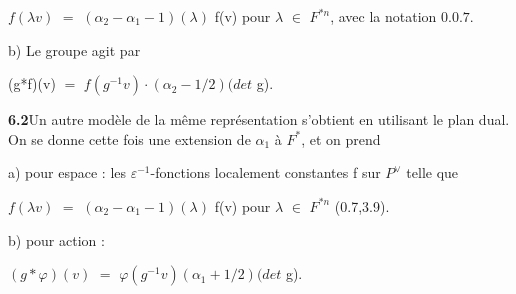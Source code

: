 \documentclass[10pt,a4paper]{article}
\begin{document}
\par\smallskip\begin{center}\begin{minipage}{0.96\textwidth}\centering
$f(\lambda{}v)$ $=$ $(\alpha{}_2-\alpha{}_1-1)(\lambda{})$ f(v) pour $\lambda{}$ $\in{}$ $F^{*n}$, avec la notation $0.0.7$.
\end{minipage}\end{center}\smallskip
\par b) Le groupe agit par\par
\par\smallskip\begin{center}\begin{minipage}{0.96\textwidth}\centering
(g*f)(v) $=$ $f(g^{-1}v)\cdot{}(\alpha{}_2-1/2)(det$ g).
\end{minipage}\end{center}\smallskip
\par\noindent\textbf{6.2}\quad Un autre modèle de la même représentation s'obtient en utilisant le plan dual. On se donne cette fois une extension de $\alpha{}_1$ à $F^*$, et on prend\par
\par a) pour espace : les $\varepsilon{}^{-1}$-fonctions localement constantes f sur $P^\vee{}$ telle que\par
\par\smallskip\begin{center}\begin{minipage}{0.96\textwidth}\centering
$f(\lambda{}v)$ $=$ $(\alpha{}_2-\alpha{}_1-1)(\lambda{})$ f(v) pour $\lambda{}$ $\in{}$ $F^{*n}$ (0.7,3.9).
\end{minipage}\end{center}\smallskip
\par b) pour action :\par
\par\smallskip\begin{center}\begin{minipage}{0.96\textwidth}\centering
$(g*\varphi{})(v)$ $=$ $\varphi{}(g^{-1}v)(\alpha{}_1+1/2)(det$ g).
\end{minipage}\end{center}\smallskip
\end{document}
